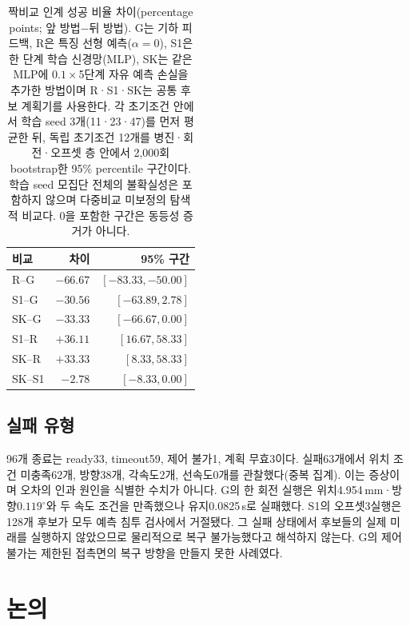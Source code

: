\documentclass[conference,a4paper]{IEEEtran}
\begin{document}
\begin{table}[t]
\caption{짝비교 인계 성공 비율 차이(percentage points; 앞 방법$-$뒤 방법).
G는 기하 피드백, R은 특징 선형 예측($\alpha=0$), S1은 한 단계 학습 신경망(MLP), SK는 같은 MLP에 $0.1\times$5단계 자유 예측 손실을 추가한 방법이며 R·S1·SK는 공통 후보 계획기를 사용한다.
각 초기조건 안에서 학습 seed 3개(11·23·47)를 먼저 평균한 뒤, 독립 초기조건 12개를 병진·회전·오프셋 층 안에서 2,000회 bootstrap한 95\% percentile 구간이다.
학습 seed 모집단 전체의 불확실성은 포함하지 않으며 다중비교 미보정의 탐색적 비교다.
0을 포함한 구간은 동등성 증거가 아니다.}\label{tab:paired}
\centering\small
\begin{tabular}{@{}lrr@{}}
\toprule 비교 & 차이 & 95\% 구간\\ \midrule
R--G & $-66.67$ & $[-83.33,-50.00]$\\
S1--G & $-30.56$ & $[-63.89,2.78]$\\
SK--G & $-33.33$ & $[-66.67,0.00]$\\
S1--R & $+36.11$ & $[16.67,58.33]$\\
SK--R & $+33.33$ & $[8.33,58.33]$\\
SK--S1 & $-2.78$ & $[-8.33,0.00]$\\
\bottomrule
\end{tabular}
\end{table}

\subsection{실패 유형}
96개 종료는 ready33, timeout59, 제어 불가1, 계획 무효3이다.
실패63개에서 위치 조건 미충족62개, 방향38개, 각속도2개, 선속도0개를 관찰했다(중복 집계).
이는 증상이며 오차의 인과 원인을 식별한 수치가 아니다.
G의 한 회전 실행은 위치4.954\,mm·방향$0.119^\circ$와 두 속도 조건을 만족했으나 유지0.0825\,s로 실패했다.
S1의 오프셋3실행은 128개 후보가 모두 예측 침투 검사에서 거절됐다.
그 실패 상태에서 후보들의 실제 미래를 실행하지 않았으므로 물리적으로 복구 불가능했다고 해석하지 않는다.
G의 제어 불가는 제한된 접촉면의 복구 방향을 만들지 못한 사례였다.

\section{논의}\label{sec:discussion}
\end{document}
